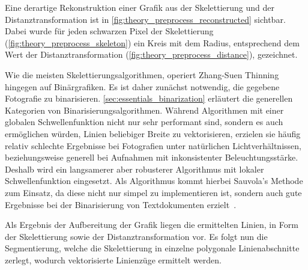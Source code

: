 Eine derartige Rekonstruktion einer Grafik aus der Skelettierung und der Distanztransformation ist in \autoref{fig:theory_preprocess_reconstructed} sichtbar.
Dabei wurde für jeden schwarzen Pixel der Skelettierung (\autoref{fig:theory_preprocess_skeleton}) ein Kreis mit dem Radius, entsprechend dem Wert der Distanztransformation (\autoref{fig:theory_preprocess_distance}), gezeichnet.

Wie die meisten Skelettierungsalgorithmen, operiert Zhang-Suen Thinning hingegen auf Binärgrafiken.
Es ist daher zunächst notwendig, die gegebene Fotografie zu binarisieren.
\autoref{sec:essentials_binarization} erläutert die generellen Kategorien von Binarisierungsalgorithmen.
Während Algorithmen mit einer globalen Schwellenfunktion nicht nur sehr performant sind, sondern es auch ermöglichen würden, Linien beliebiger Breite zu vektorisieren, erzielen sie häufig relativ schlechte Ergebnisse bei Fotografien unter natürlichen Lichtverhältnissen, beziehungsweise generell bei Aufnahmen mit inkonsistenter Beleuchtungsstärke.
Deshalb wird ein langsamerer aber robusterer Algorithmus mit lokaler Schwellenfunktion eingesetzt.
Als Algorithmus kommt hierbei Sauvola's Methode zum Einsatz, da diese nicht nur simpel zu implementieren ist, sondern auch gute Ergebnisse bei der Binarisierung von Textdokumenten erzielt~\cite{DBLP:journals/jei/SezginS04}.

Als Ergebnis der Aufbereitung der Grafik liegen die ermittelten Linien, in Form der Skelettierung sowie der Distanztransformation vor.
Es folgt nun die Segmentierung, welche die Skelettierung in einzelne polygonale Linienabschnitte zerlegt, wodurch vektorisierte Linienzüge ermittelt werden.

